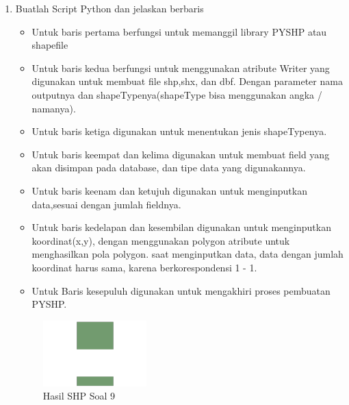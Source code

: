 \begin{enumerate}
	\item Buatlah Script Python dan jelaskan berbaris
	
	\begin{itemize}
		\item Untuk baris pertama berfungsi untuk memanggil library PYSHP atau shapefile
		\item Untuk baris kedua berfungsi untuk menggunakan atribute Writer yang digunakan untuk membuat file shp,shx, dan dbf. \hfill\break Dengan parameter nama outputnya dan shapeTypenya(shapeType bisa menggunakan angka / namanya).
		\item Untuk baris ketiga digunakan untuk menentukan jenis shapeTypenya.
		\item Untuk baris keempat dan kelima digunakan untuk membuat field yang akan disimpan pada database, dan tipe data yang digunakannya.
		\item Untuk baris keenam dan ketujuh digunakan untuk menginputkan data,sesuai dengan jumlah fieldnya.
		\item Untuk baris kedelapan dan kesembilan digunakan untuk menginputkan koordinat(x,y), dengan menggunakan polygon atribute untuk menghasilkan pola polygon. \hfill\break
		saat menginputkan data, data dengan jumlah koordinat harus sama, karena berkorespondensi 1 - 1.
		\item Untuk Baris kesepuluh digunakan untuk mengakhiri proses pembuatan PYSHP.
	\end{itemize}
	\hfill\break
	\begin{figure}[H]
		\includegraphics[width=4cm]{figures/1174002/2/9.png}
		\centering
		\caption{Hasil SHP Soal 9}
	\end{figure}


\end{enumerate}
